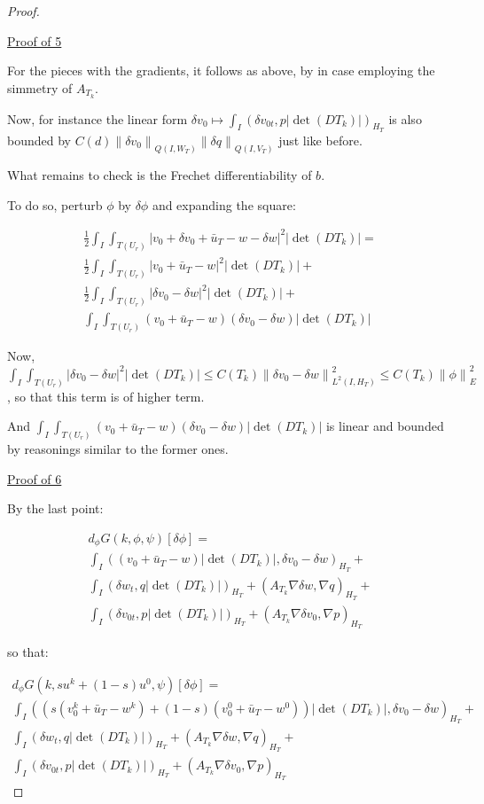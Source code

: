 \documentclass[english,a4paper,10pt,oneside]{scrbook}	%
\theoremstyle{break}
\newenvironment{mproof}[1][\proofname]{%
  \begin{proof}[#1]$ $\par\nobreak\ignorespaces
}{%
  \end{proof}
}
\renewcommand*{\proofname}{Proof}
\theoremstyle{remark}
\newcommand{\ds}{\displaystyle}
\newcommand{\norm}[1]{\left\lVert#1\right\rVert}
\begin{document}
\begin{mproof}
\underline{Proof of 5}

For the pieces with the gradients, it follows as above, by in case employing the simmetry of $A_{T_k}$.

Now, for instance the linear form $\delta v_0 \mapsto \int_I (\delta v_{0t},p |\det(DT_k)|)_{H_T}$ is also bounded by $C(d) \norm{\delta v_0}_{Q(I,W_T)}\norm{\delta q}_{Q(I,V_T)}$ just like before.

What remains to check is the Frechet differentiability of $b$.

To do so, perturb $\phi$ by $\delta \phi$ and expanding the square:

\begin{align*}
\frac{1}{2}\int_I \int_{T(U_r)}|v_0+\delta v_0+\bar{u}_T - w-\delta w|^2|\det(DT_k)| = \\\frac{1}{2}\int_I \int_{T(U_r)}|v_0+\bar{u}_T - w|^2|\det(DT_k)|+\\\frac{1}{2}\int_I \int_{T(U_r)}|\delta v_0-\delta w|^2|\det(DT_k)|+\\\int_I \int_{T(U_r)}(v_0+\bar{u}_T - w)(\delta v_0-\delta w)|\det(DT_k)|
\end{align*} 

Now, $\ds \int_I \int_{T(U_r)}|\delta v_0-\delta w|^2|\det(DT_k)|\leq C(T_k)\norm{\delta v_0-\delta w}_{L^2(I,H_T)}^2\leq C(T_k)\norm{\phi}_E^2$, so that this term is of higher term.

And $\int_I \int_{T(U_r)}(v_0+\bar{u}_T - w)(\delta v_0-\delta w)|\det(DT_k)|$ is linear and bounded by reasonings similar to the former ones.

\underline{Proof of 6}

By the last point:

\begin{align*}
d_\phi G(k, \phi ,\psi)[\delta \phi] =\\
\int_I ((v_0+\bar{u}_T - w)|\det(DT_k)|,\delta v_0-\delta w)_{H_T}+\\
\int_I (\delta w_t , q |\det(DT_k)|)_{H_T}+ (A_{T_k}\nabla \delta w, \nabla q)_{H_T}+\\
\int_I (\delta v_{0t},p |\det(DT_k)|)_{H_T} + (A_{T_k} \nabla \delta v_0, \nabla p)_{H_T}
\end{align*}

so that:

\begin{align*}
d_\phi G(k, su^k + (1-s)u^0,\psi)[\delta \phi] = \\
\int_I ((s(v_0^k+\bar{u}_T - w^k)+(1-s)(v_0^0+\bar{u}_T - w^0))|\det(DT_k)|,\delta v_0-\delta w)_{H_T}+\\
\int_I ( \delta w_t , q |\det(DT_k)|)_{H_T}+ (A_{T_k}\nabla \delta w, \nabla q)_{H_T}+\\
\int_I ( \delta v_{0t},p |\det(DT_k)|)_{H_T} + (A_{T_k} \nabla \delta v_0, \nabla p)_{H_T}
\end{align*}


\end{mproof}
\end{document}
